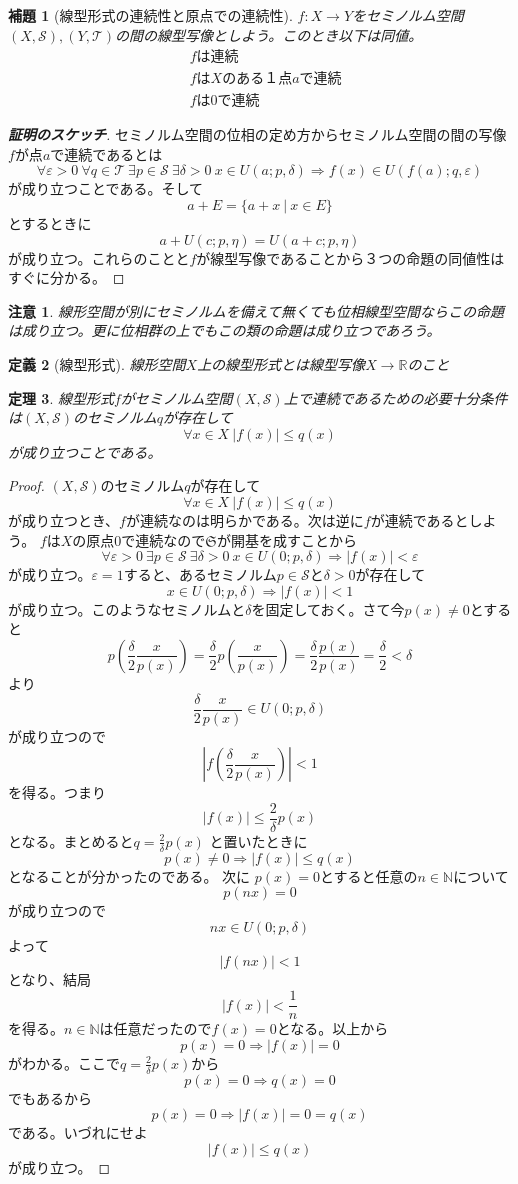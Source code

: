 \documentclass[leqno]{jsarticle}
\newtheorem{thm}{定理}
\newtheorem{lem}[thm]{補題}
\newtheorem{df}[thm]{定義}
\newtheorem*{cau}{注意}
\newcommand{\To}{\Longrightarrow}
\newcommand{\nn}{\mathbb{N}}
\newcommand{\rr}{\mathbb{R}}
\newcommand{\dpst}{\displaystyle}
\newcommand{\ep}{\varepsilon}
\newcommand{\s}{\mathcal{S}}
\newcommand{\de}{\delta}
\newcommand{\T}{\mathcal{T}}
\begin{document}
\begin{lem}[線型形式の連続性と原点での連続性]
$f:X\to Y$をセミノルム空間$(X,\s),(Y,\T)$の間の線型写像としよう。このとき以下は同値。
\begin{eqnarray}
&fは連続\\ 
&fはXのある１点aで連続\\ 
&fは0で連続
\end{eqnarray}
\end{lem}
\begin{proof}[{\bf 証明のスケッチ}]
セミノルム空間の位相の定め方からセミノルム空間の間の写像$f$が点$a$で連続であるとは
\[
\forall \ep >0\ \forall q\in \T\ \exists p\in \s\ \exists \de>0\ x\in U(a;p,\de)\To 
f(x)\in U(f(a);q,\ep)
\]
が成り立つことである。そして
\[
a+E=\{a+x\ |\ x\in E\}
\]
とするときに
\[
a+U(c;p,\eta)=U(a+c;p,\eta)
\]
が成り立つ。これらのことと$f$が線型写像であることから３つの命題の同値性はすぐに分かる。
\end{proof}
\begin{cau}
線形空間が別にセミノルムを備えて無くても位相線型空間ならこの命題は成り立つ。更に位相群の上でもこの類の命題は成り立つであろう。
\end{cau}



\begin{df}[線型形式]
線形空間$X$上の線型形式とは線型写像$X\to \rr$のこと
\end{df}



\begin{thm}
線型形式$f$がセミノルム空間$(X,\s)$上で連続であるための必要十分条件は$(X,\s)$のセミノルム$q$が存在して
\[
\forall x\in X \ |f(x)|\le q(x)
\]が成り立つことである。
\end{thm}
\begin{proof}
$(X,\s)$のセミノルム$q$が存在して
\[
\forall x\in X \ |f(x)|\le q(x)
\]が成り立つとき、$f$が連続なのは明らかである。次は逆に$f$が連続であるとしよう。
$f$は$X$の原点$0$で連続なので$\mathfrak{S}$が開基を成すことから
\[
\forall \ep >0\ \exists p\in \s\ \exists \de>0\ x\in U(0;p,\de)\To |f(x)|<\ep
\]
が成り立つ。$\ep =1$すると、あるセミノルム$p\in \s$と$\de>0$が存在して
\[
x\in U(0;p,\de)\To |f(x)|<1
\]
が成り立つ。このようなセミノルムと$\de$を固定しておく。さて今$p(x)\neq 0$とすると
\[
p\left(\frac{\de}{2}\frac{x}{p(x)}\right)=\frac{\de}{2}p\left(\frac{x}{p(x)}\right)=\frac{\de}{2}\frac{p(x)}{p(x)}=\frac{\de}{2}<\de
\]
より
\[
\frac{\de}{2}\frac{x}{p(x)}\in U(0;p,\de)
\]
が成り立つので
\[
|f\left(\frac{\de}{2}\frac{x}{p(x)}\right)|<1
\]
を得る。つまり
\[
|f(x)|\le \frac{2}{\de}p(x)
\]
となる。まとめると$\dpst q=\frac{2}{\de}p(x)$
と置いたときに
\[
p(x)\neq 0\To |f(x)|\le q(x)
\]
となることが分かったのである。
次に
$p(x)=0$とすると任意の$n\in \nn$について
\[
p(nx)=0
\]
が成り立つので
\[
nx\in U(0;p,\de)
\]
よって
\[
|f(nx)|<1
\]
となり、結局
\[
|f(x)|<\frac{1}{n}
\]
を得る。$n\in \nn$は任意だったので$f(x)=0$となる。以上から
\[
p(x)=0\To |f(x)|=0
\]
がわかる。ここで$\dpst q=\frac{2}{\de}p(x)$から
\[
p(x)=0\To q(x)=0
\]
でもあるから
\[
p(x)=0\To |f(x)|=0=q(x)
\]
である。いづれにせよ
\[
|f(x)|\le q(x)
\]
が成り立つ。
\end{proof}
\end{document}
